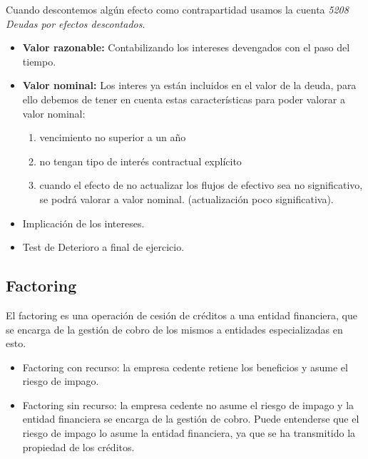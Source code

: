 \documentclass[a4paper,12pt]{article}
\begin{document}
Cuando descontemos algún efecto como contrapartidad usamos la cuenta \textit{5208 Deudas por efectos descontados}.\\

\begin{tcolorbox}[colback=blue!5!white,colframe=blue!75!black,fonttitle=\bfseries,title=Tipos de valoración inicial]
    \begin{itemize}
        \item \textbf{Valor razonable: }Contabilizando los intereses devengados con el paso del tiempo.
        \item \textbf{Valor nominal: }Los interes ya están incluidos en el valor de la deuda, para ello debemos de tener en cuenta estas características para poder valorar a valor nominal:
        \begin{enumerate}
            \item vencimiento no superior a un año
            \item no tengan tipo de interés contractual explícito
            \item cuando el efecto de no actualizar los flujos de efectivo sea no significativo, se podrá valorar a valor nominal. (actualización poco significativa).
        \end{enumerate} 
    \end{itemize}
    
\end{tcolorbox}

\begin{tcolorbox}[colback=blue!5!white,colframe=blue!75!black,fonttitle=\bfseries,title=Valoración posterior]
    \begin{itemize}
        \item Implicación de los intereses.
        \item Test de Deterioro a final de ejercicio. 
    \end{itemize}
    
\end{tcolorbox}

\subsection{Factoring}

El factoring es una operación de cesión de créditos a una entidad financiera, que se encarga de la gestión de cobro de los mismos a entidades especializadas en esto.\\

\begin{itemize}
    \item Factoring con recurso: la empresa cedente retiene los beneficios y asume el riesgo de impago.
    \item Factoring sin recurso: la empresa cedente no asume el riesgo de impago y la entidad financiera se encarga de la gestión de cobro. Puede entenderse que el riesgo de impago lo asume la entidad financiera, ya que se ha transmitido la propiedad de los créditos.
\end{itemize}
\end{document}
